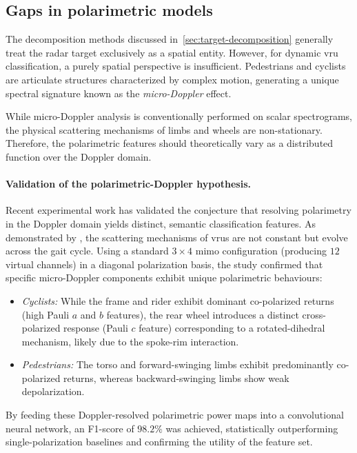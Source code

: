 \subsection{Gaps in polarimetric models}
\label{sec:gaps-models}

The decomposition methods discussed in~\cref{sec:target-decomposition} generally treat the radar target exclusively as a spatial entity.
However, for dynamic \gls{vru} classification, a purely spatial perspective is insufficient.
Pedestrians and cyclists are articulate structures characterized by complex motion, generating a unique spectral signature known as the \emph{micro-Doppler} effect.

While micro-Doppler analysis is conventionally performed on scalar spectrograms, the physical scattering mechanisms of limbs and wheels are non-stationary.
Therefore, the polarimetric features should theoretically vary as a distributed function over the Doppler domain.

\paragraph{Validation of the polarimetric-Doppler hypothesis.}
Recent experimental work has validated the conjecture that resolving polarimetry in the Doppler domain yields distinct, semantic classification features.
As demonstrated by \textcite{bouwmeesterClassificationDynamicVulnerable2025}, the scattering mechanisms of \glspl{vru} are not constant but evolve across the gait cycle.
Using a standard $3 \times 4$ \gls{mimo} configuration (producing $12$ virtual channels) in a diagonal polarization basis, the study confirmed that specific micro-Doppler components exhibit unique polarimetric behaviours:
\begin{itemize}
    \item \textit{Cyclists:} While the frame and rider exhibit dominant co-polarized returns (high Pauli $a$ and $b$ features), the rear wheel introduces a distinct cross-polarized response (Pauli $c$ feature) corresponding to a rotated-dihedral mechanism, likely due to the spoke-rim interaction.
    \item \textit{Pedestrians:} The torso and forward-swinging limbs exhibit predominantly co-polarized returns, whereas backward-swinging limbs show weak depolarization.
\end{itemize}
By feeding these Doppler-resolved polarimetric power maps into a convolutional neural network, an F1-score of $98.2\%$ was achieved, statistically outperforming single-polarization baselines and confirming the utility of the feature set.

